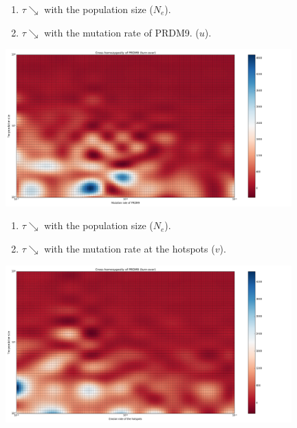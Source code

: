 \documentclass[10pt]{beamer}
\begin{document}
\begin{frame}
	\begin{center}
		\begin{enumerate}
		\item $\tau \searrow$ with the population size ($N_e$).
			
		\item $\tau \searrow$ with the mutation rate of PRDM9. ($u$).
		\end{enumerate}
       \includegraphics[width=11cm]{Images/cross-homozygosity-population-mutation.png}
	\end{center}
\end{frame}

\begin{frame}
	\begin{center}
		\begin{enumerate}
		\item $\tau \searrow$ with the population size ($N_e$).
			
		\item $\tau \searrow$ with the mutation rate at the hotspots ($v$).
		\end{enumerate}
       \includegraphics[width=11cm]{Images/cross-homozygosity-population-erosion.png}
	\end{center}
\end{frame}
\end{document}
